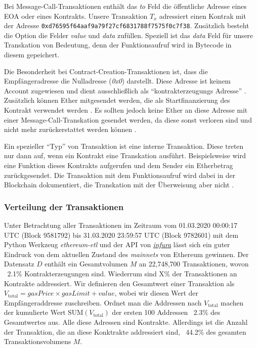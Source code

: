 \documentclass[runningheads]{llncs}
\begin{document}
Bei Message-Call-Transaktionen enthält das \textit{to} Feld die öffentliche Adresse eines EOA oder eines Kontrakts. Unsere Transaktion $T_x$ adressiert einen Kontrak mit der Adresse \verb+0xd76595f64aaf9a79f27cf6831788f7575f0c7f38+. Zusätzlich besteht die Option die Felder \textit{value} und \textit{data} zufüllen. Speziell ist das \textit{data} Feld für unsere Transkation von Bedeutung, denn der Funktionsaufruf wird in Bytecode in diesem gepeichert.

Die Besonderheit bei Contract-Creation-Transaktionen ist, dass die Empfängeradresse die Nulladresse (\textit{0x0}) darstellt. Diese Adresse ist keinem Account zugewiesen und dient ausschließlich als "`kontrakterzeugungs Adresse"' \cite{antonopoulos_mastering_2019}. Zusätzlich können Ether mitgesendet werden, die als Startfinanzierung des Kontrakt verwendet werden \cite[S. 4]{wood_ethereum/yellowpaper_2019}. Es sollten jedoch keine Ether an diese Adresse mit einer Message-Call-Transkation gesendet werden, da diese sonst verloren sind und nicht mehr zurückerstattet werden können \cite[S. 112]{antonopoulos_mastering_2019}.

Ein spezieller "`Typ"' von Transaktion ist eine interne Transaktion. Diese treten nur dann auf, wenn ein Kontrakt eine Transkation ausführt. Beispielsweise wird eine Funktion dieses Kontrakts aufgerufen und dem Sender ein Etherbetrag zurückgesendet. Die Transaktion mit dem Funktionsaufruf wird dabei in der Blockchain dokumentiert, die Transkation mit der Überweisung aber nicht \cite[S. 40]{antonopoulos_mastering_2019}.

\subsubsection{Verteilung der Transaktionen}
Unter Betrachtung aller Transaktionen im Zeitraum vom 01.03.2020 00:00:17 UTC (Block 9581792) bis 31.03.2020 23:59:57 UTC (Block 9782601) mit dem Python Werkzeug \textit{ethereum-etl} \cite{noauthor_blockchain-etl/ethereum-etl_2020} und der API von \href{https://infura.io/}{\textit{infura}} lässt sich ein guter Eindruck von dem aktuellen Zustand des \textit{mainnets} von Ethereum gewinnen. Der Datensatz $ D $ enthält ein Gesamtvolumen $ M $ an 22,748,700 Transaktionen, wovon ~2.1\% Kontrakterzeugungen sind. Wiederrum sind X\% der Transaktionen an Kontrakte addressiert. Wir definieren den Gesamtwert einer Transaktion als $ V_{\text{total}} = \textit{gasPrice} \times \textit{gasLimit} + \textit{value} $, wobei wir diesen Wert der Empfängeraddresse zuschreiben. Ordnet man die Addressen nach $ V_{\text{total}} $ machen der kumulierte Wert $ \text{SUM}(V_{\text{total}}) $ der ersten 100 Addressen ~2.3\% des Gesamtwertes aus. Alle diese Adressen sind Kontrakte. Allerdings ist die Anzahl der Transaktion, die an diese Konktrakte addressiert sind, ~44.2\% des gesamten Transaktionsvolumens $ M $. \cite{neemann_appendix_nodate}
\end{document}

